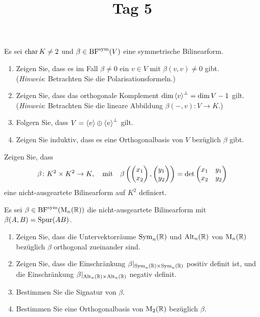 \documentclass[a4paper, 10pt]{scrartcl}
\title{Tag 5}
\author{}
\date{}
\begin{document}
\begin{question}
  Es sei $\operatorname{char} K \neq 2$ und $\beta \in \operatorname{BF}^{\operatorname{sym}}(V)$ eine symmetrische Bilinearform.
  \begin{enumerate}
    \item
      Zeigen Sie, dass es im Fall $\beta \neq 0$ ein $v \in V$ mit $\beta(v,v) \neq 0$ gibt.\\
      (\emph{Hinweis}:
       Betrachten Sie die Polarisationsformeln.)
       
      
    \item
      Zeigen Sie, dass das orthogonale Komplement $\dim \left\langle v \right\rangle^\perp = \dim V - 1$ gilt.\\
      (\emph{Hinweis}:
       Betrachten Sie die lineare Abbildung $\beta(-, v) \colon V \to K$.) 
    \item
      Folgern Sie, dass $V = \left\langle v \right\rangle \oplus \left\langle v \right\rangle^\perp$ gilt.
    \item
      Zeigen Sie induktiv, dass es eine Orthogonalbasis von $V$ bezüglich $\beta$ gibt.
  \end{enumerate}
\end{question}





\begin{question}
  Zeigen Sie, dass
  \[
            \beta
    \colon  K^2 \times K^2
    \to     K,
    \quad\text{mit}\quad
      \beta\left( \begin{pmatrix} x_1 \\ x_2 \end{pmatrix}, \begin{pmatrix} y_1 \\ y_2 \end{pmatrix} \right)
    = \det
      \begin{pmatrix}
        x_1 & y_1 \\
        x_2 & y_2
      \end{pmatrix}
  \]
  eine nicht-ausgeartete Bilinearform auf $K^2$ definiert.
\end{question}





\begin{question}
  Es sei $\beta \in \operatorname{BF}^{\operatorname{sym}}(\operatorname{M}_{n}(\mathbb{R}))$ die nicht-ausgeartete Bilinearform mit $\beta(A,B) = \operatorname{Spur}(AB)$.
  \begin{enumerate}
    \item
      Zeigen Sie, dass die Untervektorräume $\operatorname{Sym}_{n}(\mathbb{R})$ und $\operatorname{Alt}_{n}(\mathbb{R})$ von $\operatorname{M}_{n}(\mathbb{R})$ bezüglich $\beta$ orthogonal zueinander sind.
    \item
      Zeigen Sie, dass die Einschränkung $\beta|_{\operatorname{Sym}_{n}(\mathbb{R}) \times \operatorname{Sym}_{n}(\mathbb{R})}$ positiv definit ist, und die Einschränkung $\beta|_{\operatorname{Alt}_{n}(\mathbb{R}) \times \operatorname{Alt}_{n}(\mathbb{R})}$ negativ definit.
    \item
      Bestimmen Sie die Signatur von $\beta$.
    \item
      Bestimmen Sie eine Orthogonalbasis von $\operatorname{M}_{2}(\mathbb{R})$ bezüglich $\beta$.
  \end{enumerate}
\end{question}
\end{document}
